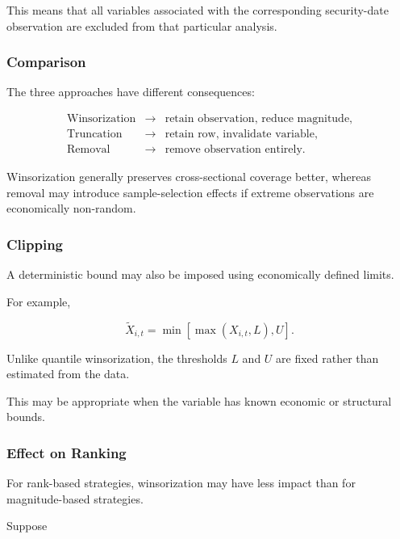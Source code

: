 \documentclass[11pt,a4paper]{article}
\begin{document}
This means that all variables associated with the corresponding security-date
observation are excluded from that particular analysis.


\subsubsection{Comparison}

The three approaches have different consequences:

\begin{equation}
\boxed{
\begin{array}{lll}
\text{Winsorization}
&
\rightarrow
&
\text{retain observation, reduce magnitude},
\\[0.15cm]
\text{Truncation}
&
\rightarrow
&
\text{retain row, invalidate variable},
\\[0.15cm]
\text{Removal}
&
\rightarrow
&
\text{remove observation entirely}.
\end{array}
}
\end{equation}

Winsorization generally preserves cross-sectional coverage better, whereas
removal may introduce sample-selection effects if extreme observations are
economically non-random.


\subsubsection{Clipping}

A deterministic bound may also be imposed using economically defined limits.

For example,

\begin{equation}
\widetilde{X}_{i,t}
=
\min
\left[
\max
\left(
X_{i,t},
L
\right),
U
\right].
\end{equation}

Unlike quantile winsorization, the thresholds $L$ and $U$ are fixed rather than
estimated from the data.

This may be appropriate when the variable has known economic or structural
bounds.


\subsubsection{Effect on Ranking}

For rank-based strategies, winsorization may have less impact than for
magnitude-based strategies.

Suppose
\end{document}

